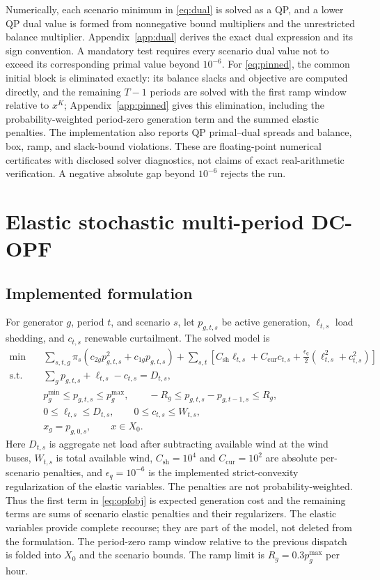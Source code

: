 \documentclass[preprint,12pt,3p]{elsarticle}
\theoremstyle{definition}
\begin{document}
Numerically, each scenario minimum in \eqref{eq:dual} is solved as a QP, and a lower QP dual value is formed from nonnegative bound multipliers and the unrestricted balance multiplier. Appendix~\ref{app:dual} derives the exact dual expression and its sign convention. A mandatory test requires every scenario dual value not to exceed its corresponding primal value beyond $10^{-6}$. For \eqref{eq:pinned}, the common initial block is eliminated exactly: its balance slacks and objective are computed directly, and the remaining $T-1$ periods are solved with the first ramp window relative to $x^K$; Appendix~\ref{app:pinned} gives this elimination, including the probability-weighted period-zero generation term and the summed elastic penalties. The implementation also reports QP primal--dual spreads and balance, box, ramp, and slack-bound violations. These are floating-point numerical certificates with disclosed solver diagnostics, not claims of exact real-arithmetic verification. A negative absolute gap beyond $10^{-6}$ rejects the run.
\section{Elastic stochastic multi-period DC-OPF}
\subsection{Implemented formulation}
For generator $g$, period $t$, and scenario $s$, let $p_{g,t,s}$ be active generation, $\ell_{t,s}$ load shedding, and $c_{t,s}$ renewable curtailment. The solved model is
\begin{align}
\min\quad &\sum_{s,t,g}\pi_s(c_{2g}p_{g,t,s}^2+c_{1g}p_{g,t,s})
+\sum_{s,t}\left[C_{\mathrm{sh}}\ell_{t,s}+C_{\mathrm{cur}}c_{t,s}
+\frac{\epsilon_q}{2}(\ell_{t,s}^2+c_{t,s}^2)\right]\label{eq:opfobj}\\
\mathrm{s.t.}\quad &\sum_g p_{g,t,s}+\ell_{t,s}-c_{t,s}=D_{t,s},\label{eq:balance}\\
&p_g^{\min}\leq p_{g,t,s}\leq p_g^{\max},\qquad
-R_g\leq p_{g,t,s}-p_{g,t-1,s}\leq R_g,\label{eq:boxramp}\\
&0\leq\ell_{t,s}\leq D_{t,s},\qquad0\leq c_{t,s}\leq W_{t,s},\label{eq:elasticbounds}\\
&x_g=p_{g,0,s},\qquad x\in X_0.\label{eq:consensus}
\end{align}
Here $D_{t,s}$ is aggregate net load after subtracting available wind at the wind buses, $W_{t,s}$ is total available wind, $C_{\mathrm{sh}}=10^4$ and $C_{\mathrm{cur}}=10^2$ are absolute per-scenario penalties, and $\epsilon_q=10^{-6}$ is the implemented strict-convexity regularization of the elastic variables. The penalties are not probability-weighted. Thus the first term in \eqref{eq:opfobj} is expected generation cost and the remaining terms are sums of scenario elastic penalties and their regularizers. The elastic variables provide complete recourse; they are part of the model, not deleted from the formulation. The period-zero ramp window relative to the previous dispatch is folded into $X_0$ and the scenario bounds. The ramp limit is $R_g=0.3p_g^{\max}$ per hour.
\end{document}
